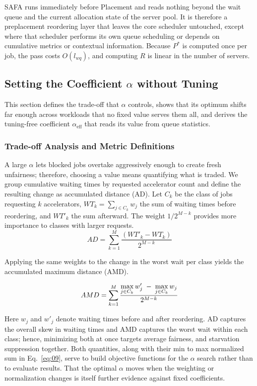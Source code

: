 \documentclass{ieeetj}
\begin{document}
SAFA runs immediately before Placement and reads nothing beyond the wait queue and the current allocation state of the server pool. It is therefore a preplacement reordering layer that leaves the core scheduler untouched, except where that scheduler performs its own queue scheduling or depends on cumulative metrics or contextual information. Because $P^*$ is computed once per job, the pass costs $O(l_{wq})$, and computing $R$ is linear in the number of servers.

\subsection{Setting the Coefficient $\alpha$ without Tuning}\label{sec:coeff}
This section defines the trade-off that $\alpha$ controls, shows that its optimum shifts far enough across workloads that no fixed value serves them all, and derives the tuning-free coefficient $\alpha_{\text{eff}}$ that reads its value from queue statistics.

\subsubsection{Trade-off Analysis and Metric Definitions}
A large $\alpha$ lets blocked jobs overtake aggressively enough to create fresh unfairness; therefore, choosing a value means quantifying what is traded. We group cumulative waiting times by requested accelerator count and define the resulting change as accumulated distance (AD). Let $C_k$ be the class of jobs requesting $k$ accelerators, $WT_k=\sum_{j\in C_k} w_j$ the sum of waiting times before reordering, and $WT'_k$ the sum afterward. The weight $1/2^{M-k}$ provides more importance to classes with larger requests.
\begin{equation}
AD = \sum_{k=1}^{M} \frac{(WT'_k - WT_k)}{2^{M-k}}
\label{eq:07}
\end{equation}

Applying the same weights to the change in the worst wait per class yields the accumulated maximum distance (AMD).

\begin{equation}
AMD = \sum_{k=1}^{M} \frac{\max\limits_{j\in C_k} w'_j \;-\; \max\limits_{j\in C_k} w_j}{2^{M-k}}
\label{eq:08}
\vspace{2pt}
\end{equation}

Here $w_j$ and $w'_j$ denote waiting times before and after reordering. AD captures the overall skew in waiting times and AMD captures the worst wait within each class; hence, minimizing both at once targets average fairness, and starvation suppression together. Both quantities, along with their min to max normalized sum in Eq.~\eqref{eq:09}, serve to build objective functions for the $\alpha$ search rather than to evaluate results. That the optimal $\alpha$ moves when the weighting or normalization changes is itself further evidence against fixed coefficients.
\end{document}
